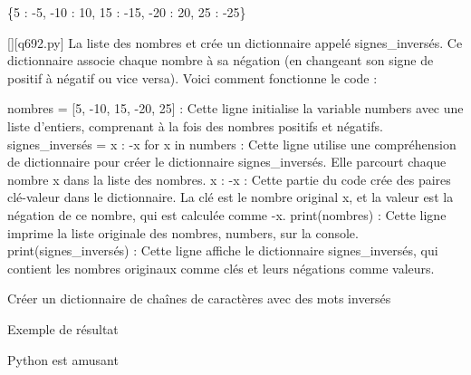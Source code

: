 \{5 : -5, -10 : 10, 15 : -15, -20 : 20, 25 : -25\}
        \par
        \begin{solution}
            \renewcommand{\nomfichier}{q692.py}
            \pythonfile{\chemincode \nomfichier}[][\nomfichier]
            La liste des nombres et crée un dictionnaire appelé signes_inversés. Ce dictionnaire associe chaque nombre à sa négation (en changeant son signe de positif à négatif ou vice versa). Voici comment fonctionne le code :

    nombres = [5, -10, 15, -20, 25] : Cette ligne initialise la variable numbers avec une liste d'entiers, comprenant à la fois des nombres positifs et négatifs.
    signes_inversés = {x : -x for x in numbers} : Cette ligne utilise une compréhension de dictionnaire pour créer le dictionnaire signes_inversés. Elle parcourt chaque nombre x dans la liste des nombres.
        {x : -x} : Cette partie du code crée des paires clé-valeur dans le dictionnaire. La clé est le nombre original x, et la valeur est la négation de ce nombre, qui est calculée comme -x.
    print(nombres) : Cette ligne imprime la liste originale des nombres, numbers, sur la console.
    print(signes_inversés) : Cette ligne affiche le dictionnaire signes_inversés, qui contient les nombres originaux comme clés et leurs négations comme valeurs.
        \end{solution}
        

        \question
        Créer un dictionnaire de chaînes de caractères avec des mots inversés

Exemple de résultat

Python est amusant

